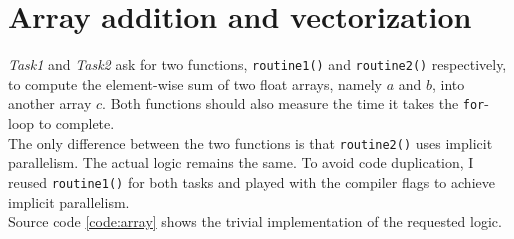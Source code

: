 \section{Array addition and vectorization}

\textit{Task1} and \textit{Task2} ask for two functions, \texttt{routine1()} and \texttt{routine2()} respectively, to %
compute the element-wise sum of two float arrays, namely $a$ and $b$, into another array $c$. Both functions should also %
measure the time it takes the \texttt{for}-loop to complete. \\
The only difference between the two functions is that \texttt{routine2()} uses implicit parallelism. The actual %
logic remains the same. To avoid code duplication, I reused \texttt{routine1()} for both tasks and played with the compiler %
flags to achieve implicit parallelism.\\%
Source code \ref{code:array} shows the trivial implementation of the requested logic.\\
%

